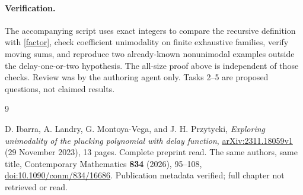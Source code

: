 \documentclass[11pt]{article}
\begin{document}
\paragraph{Verification.}
The accompanying script uses exact integers to compare the
recursive definition with \eqref{factor}, check coefficient
unimodality on finite exhaustive families, verify moving sums,
and reproduce two already-known nonunimodal examples outside
the delay-one-or-two hypothesis. The all-size proof above is
independent of those checks. Review was by the authoring agent
only. Tasks 2--5 are proposed questions, not claimed results.

\begin{thebibliography}{9}
\raggedright\small
{} D. Ibarra, A. Landry, G. Montoya-Vega,
and J. H. Przytycki, \emph{Exploring unimodality of the plucking
polynomial with delay function},
\href{https://arxiv.org/abs/2311.18059}{arXiv:2311.18059v1}
(29 November 2023), 13 pages. Complete preprint read.
 The same authors, same title, Contemporary
Mathematics \textbf{834} (2026), 95--108,
\href{https://doi.org/10.1090/conm/834/16686}{doi:10.1090/conm/834/16686}.
Publication metadata verified; full chapter not retrieved or read.
\end{thebibliography}
\end{document}
